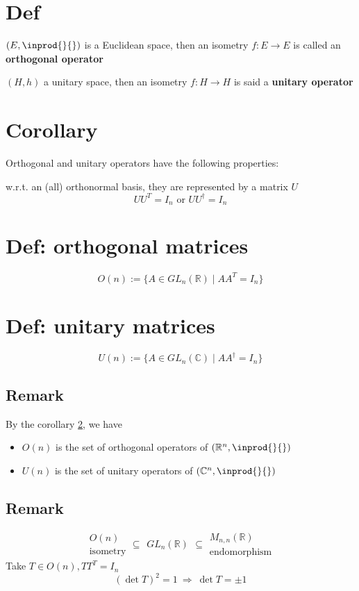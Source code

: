 \documentclass{book}
\begin{document}
\section{Def}
$(E,\inprod{}{})$ is a Euclidean space, then an isometry $f:E\rightarrow E$ is called an \textbf{orthogonal operator}

$(H,h)$ a unitary space, then an isometry $f:H\rightarrow H$ is said a \textbf{unitary operator}
\section{Corollary}
\label{corollary 63.11}
Orthogonal and unitary operators have the following properties:

w.r.t. an (all) orthonormal basis, they are represented by a matrix $U$
$$UU^T=I_n\text{ or }UU^\dagger=I_n$$
\section{Def: orthogonal matrices}
$$O(n):=\{A\in GL_n(\mathbb{R})\mid AA^T=I_n\}$$
\section{Def: unitary matrices}
$$U(n):=\{A\in GL_n(\mathbb{C})\mid AA^\dagger=I_n\}$$
\subsection*{Remark}
By the corollary \ref{corollary 63.11}, we have\begin{itemize}
    \item $O(n)$ is the set of orthogonal operators of $(\mathbb{R}^n,\inprod{}{})$
    \item $U(n)$ is the set of unitary operators of $(\mathbb{C}^n,\inprod{}{})$
\end{itemize}
\subsection*{Remark}
$$
\begin{aligned}
    O(n)\\\text{isometry}
\end{aligned}
\subseteq
\begin{aligned}
    GL_n(\mathbb{R})
\end{aligned}
\subseteq
\begin{aligned}
    M_{n,n}(\mathbb{R})\\\text{endomorphism}
\end{aligned}$$
Take $T\in O(n),TT^T=I_n$$$(\det T)^2=1\ \Rightarrow\ \det T=\pm 1$$
\end{document}
